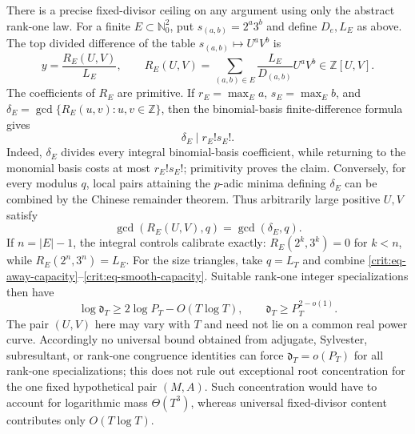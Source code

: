 \documentclass[11pt,oneside]{article}
\theoremstyle{definition}
\theoremstyle{remark}
\newcommand{\Nzero}{\mathbb N_0}
\newcommand{\Z}{\mathbb Z}
\begin{document}
There is a precise fixed-divisor ceiling on any argument using only the abstract rank-one
law.  For a finite $E\subset\Nzero^2$, put $s_{(a,b)}=2^a3^b$ and define $D_e,L_E$ as
above.  The top divided difference of the table $s_{(a,b)}\mapsto U^aV^b$ is
\begin{equation}
 [E]y=\frac{R_E(U,V)}{L_E},\qquad
 R_E(U,V)=\sum_{(a,b)\in E}\frac{L_E}{D_{(a,b)}}U^aV^b\in\Z[U,V].
 \label{crit:eq-rank-one-fixed-divisor}
\end{equation}
The coefficients of $R_E$ are primitive.  If $r_E=\max_Ea$, $s_E=\max_Eb$, and
$\delta_E=\gcd\{R_E(u,v):u,v\in\Z\}$, then the binomial-basis finite-difference formula
gives
\begin{equation}
 \boxed{\delta_E\mid r_E!s_E!.}
 \label{crit:eq-rank-one-fixed-divisor-bound}
\end{equation}
Indeed, $\delta_E$ divides every integral binomial-basis coefficient, while returning to
the monomial basis costs at most $r_E!s_E!$; primitivity proves the claim.  Conversely, for
every modulus $q$, local pairs attaining the $p$-adic minima defining $\delta_E$ can be
combined by the Chinese remainder theorem.  Thus arbitrarily large positive $U,V$ satisfy
\[
 \gcd(R_E(U,V),q)=\gcd(\delta_E,q).
\]
If $n=|E|-1$, the integral controls calibrate exactly:
$R_E(2^k,3^k)=0$ for $k<n$, while $R_E(2^n,3^n)=L_E$.
For the size triangles, take $q=L_T$ and combine
\eqref{crit:eq-away-capacity}--\eqref{crit:eq-smooth-capacity}.  Suitable rank-one integer
specializations then have
\begin{equation}
 \log\mathfrak d_T\ge2\log P_T-O(T\log T),
 \qquad \mathfrak d_T\ge P_T^{2-o(1)}.
 \label{crit:eq-rank-one-fixed-divisor-no-go}
\end{equation}
The pair $(U,V)$ here may vary with $T$ and need not lie on a common real power curve.
Accordingly no universal bound obtained from adjugate, Sylvester, subresultant, or rank-one
congruence identities can force $\mathfrak d_T=o(P_T)$ for all rank-one specializations; this
does not rule out exceptional root concentration for the one fixed
hypothetical pair $(M,A)$.  Such concentration would have to account for logarithmic mass
$\Theta(T^3)$, whereas universal fixed-divisor content contributes only $O(T\log T)$.
\end{document}
